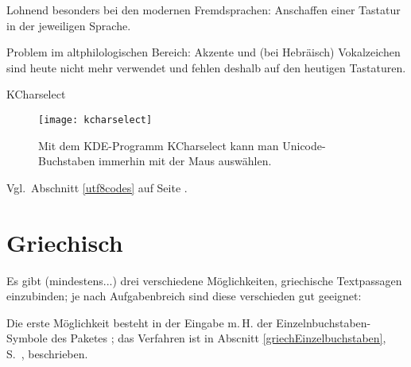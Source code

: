 





Lohnend besonders bei den modernen Fremdsprachen: Anschaffen einer Tastatur in der jeweiligen
Sprache.

Problem im altphilologischen Bereich: Akzente und (bei Hebräisch) Vokalzeichen sind heute
nicht mehr verwendet und fehlen deshalb auf den heutigen Tastaturen.

KCharselect

\begin{figure}
 \texttt{[image: kcharselect]}
 \caption{Mit dem KDE-Programm KCharselect kann man Unicode-Buchstaben immerhin mit der Maus
 auswählen.}
\end{figure}


Vgl.\ Abschnitt \ref{utf8codes} auf Seite \pageref{utf8codes}.

\section{Griechisch}

Es gibt (mindestens...) drei verschiedene Möglichkeiten, griechische Textpassagen einzubinden;
je nach Aufgabenbreich sind diese verschieden gut geeignet:



Die erste Möglichkeit besteht in der Eingabe m.\,H. der Einzelnbuchstaben-Symbole des Paketes
; das Verfahren ist in Abscnitt \ref{griechEinzelbuchstaben},
S.~\pageref{griechEinzelbuchstaben}, beschrieben.

